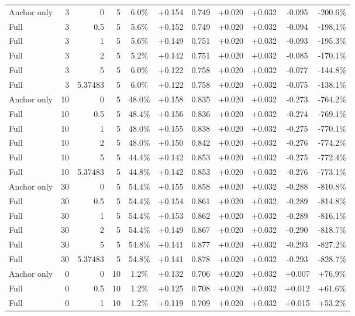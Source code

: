 \begin{table}[htbp]
\begin{tabular}{lrrrccccccc}
Anchor only & 3 & 0 & 5 & 6.0\% & +0.154 & 0.749 & +0.020 & +0.032 & -0.095 & -200.6\% \\
Full & 3 & 0.5 & 5 & 5.6\% & +0.152 & 0.749 & +0.020 & +0.032 & -0.094 & -198.1\% \\
Full & 3 & 1 & 5 & 5.6\% & +0.149 & 0.751 & +0.020 & +0.032 & -0.093 & -195.3\% \\
Full & 3 & 2 & 5 & 5.2\% & +0.142 & 0.751 & +0.020 & +0.032 & -0.085 & -170.1\% \\
Full & 3 & 5 & 5 & 6.0\% & +0.122 & 0.758 & +0.020 & +0.032 & -0.077 & -144.8\% \\
Full & 3 & 5.37483 & 5 & 6.0\% & +0.122 & 0.758 & +0.020 & +0.032 & -0.075 & -138.1\% \\
Anchor only & 10 & 0 & 5 & 48.0\% & +0.158 & 0.835 & +0.020 & +0.032 & -0.273 & -764.2\% \\
Full & 10 & 0.5 & 5 & 48.4\% & +0.156 & 0.836 & +0.020 & +0.032 & -0.274 & -769.1\% \\
Full & 10 & 1 & 5 & 48.0\% & +0.155 & 0.838 & +0.020 & +0.032 & -0.275 & -770.1\% \\
Full & 10 & 2 & 5 & 48.0\% & +0.150 & 0.842 & +0.020 & +0.032 & -0.276 & -774.2\% \\
Full & 10 & 5 & 5 & 44.4\% & +0.142 & 0.853 & +0.020 & +0.032 & -0.275 & -772.4\% \\
Full & 10 & 5.37483 & 5 & 44.8\% & +0.142 & 0.853 & +0.020 & +0.032 & -0.276 & -773.1\% \\
Anchor only & 30 & 0 & 5 & 54.4\% & +0.155 & 0.858 & +0.020 & +0.032 & -0.288 & -810.8\% \\
Full & 30 & 0.5 & 5 & 54.4\% & +0.154 & 0.861 & +0.020 & +0.032 & -0.289 & -814.8\% \\
Full & 30 & 1 & 5 & 54.4\% & +0.153 & 0.862 & +0.020 & +0.032 & -0.289 & -816.1\% \\
Full & 30 & 2 & 5 & 54.4\% & +0.149 & 0.867 & +0.020 & +0.032 & -0.290 & -818.7\% \\
Full & 30 & 5 & 5 & 54.8\% & +0.141 & 0.877 & +0.020 & +0.032 & -0.293 & -827.2\% \\
Full & 30 & 5.37483 & 5 & 54.8\% & +0.141 & 0.878 & +0.020 & +0.032 & -0.293 & -828.7\% \\
Anchor only & 0 & 0 & 10 & 1.2\% & +0.132 & 0.706 & +0.020 & +0.032 & +0.007 & +76.9\% \\
Full & 0 & 0.5 & 10 & 1.2\% & +0.125 & 0.708 & +0.020 & +0.032 & +0.012 & +61.6\% \\
Full & 0 & 1 & 10 & 1.2\% & +0.119 & 0.709 & +0.020 & +0.032 & +0.015 & +53.2\% \\

\end{tabular}
\end{table}

